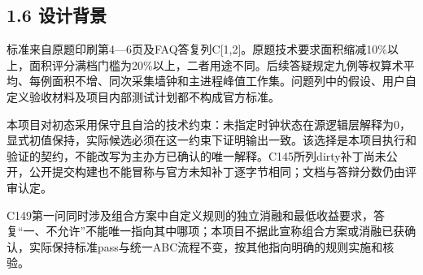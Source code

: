 \documentclass[UTF8,fontset=fandol,12pt]{ctexart}
\begin{document}
\Needspace{129.6pt}\subsection*{1.6  设计背景}
标准来自原题印刷第4—6页及FAQ答复列C[1,2]。原题技术要求面积缩减10\%以上，面积评分满档门槛为20\%以上，二者用途不同。后续答疑规定九例等权算术平均、每例面积不增、同次采集墙钟和主进程峰值工作集。问题列中的假设、用户自定义验收材料及项目内部测试计划都不构成官方标准。

本项目对初态采用保守且自洽的技术约束：未指定时钟状态在源逻辑层解释为0，显式初值保持，实际候选必须在这一约束下证明输出一致。该选择是本项目执行和验证的契约，不能改写为主办方已确认的唯一解释。C145所列dirty补丁尚未公开，公开提交构建也不能冒称与官方未知补丁逐字节相同；文档与答辩分数仍由评审认定。

C149第一问同时涉及组合方案中自定义规则的独立消融和最低收益要求，答复“一、不允许”不能唯一指向其中哪项；本项目不据此宣称组合方案或消融已获确认，实际保持标准pass与统一ABC流程不变，按其他指向明确的规则实施和核验。
\end{document}
